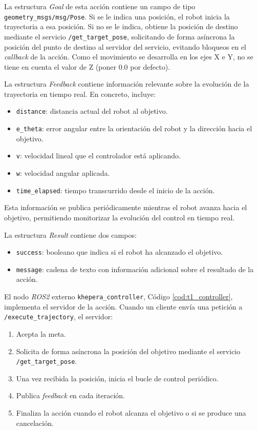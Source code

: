 \begin{itemize}
    La estructura \textit{Goal} de esta acción contiene un campo de tipo \texttt{geometry\_msgs/msg/Pose}.
    Si se le indica una posición, el robot inicia la trayectoria a esa posición. Si no se le indica,
    obtiene la posición de destino mediante el servicio \texttt{/get\_target\_pose}, 
    solicitando de forma asíncrona la posición del punto de destino al servidor del servicio, evitando 
    bloqueos en el \textit{callback} de la acción. Como el movimiento se desarrolla 
    en los ejes X e Y, no se tiene en cuenta el valor de Z (poner 0.0 por defecto).

    La estructura \textit{Feedback} contiene información relevante sobre la evolución 
    de la trayectoria en tiempo real. En concreto, incluye:
    \begin{itemize}
        \item \texttt{distance}: distancia actual del robot al objetivo.
        \item \texttt{e\_theta}: error angular entre la orientación del robot y la 
        dirección hacia el objetivo.
        \item \texttt{v}: velocidad lineal que el controlador está aplicando.
        \item \texttt{w}: velocidad angular aplicada.
        \item \texttt{time\_elapsed}: tiempo transcurrido desde el inicio de la acción.
    \end{itemize}

    Esta información se publica periódicamente mientras el robot avanza hacia el 
    objetivo, permitiendo monitorizar la evolución del control en tiempo real.

    La estructura \textit{Result} contiene dos campos:
    \begin{itemize}
        \item \texttt{success}: booleano que indica si el robot ha alcanzado el 
        objetivo.
        \item \texttt{message}: cadena de texto con información adicional sobre el 
        resultado de la acción.
    \end{itemize}

    El nodo \textit{ROS2} externo \texttt{khepera\_controller}, 
    Código \ref{cod:t1_controller}, implementa el servidor de la acción. Cuando un 
    cliente envía una petición a \texttt{/execute\_trajectory}, el servidor:
    \begin{enumerate}
        \item Acepta la meta.
        \item Solicita de forma asíncrona la posición del objetivo mediante el 
        servicio \texttt{/get\_target\_pose}.
        \item Una vez recibida la posición, inicia el bucle de control periódico.
        \item Publica \textit{feedback} en cada iteración.
        \item Finaliza la acción cuando el robot alcanza el objetivo o si se produce 
        una cancelación.
    \end{enumerate}


\end{itemize}
